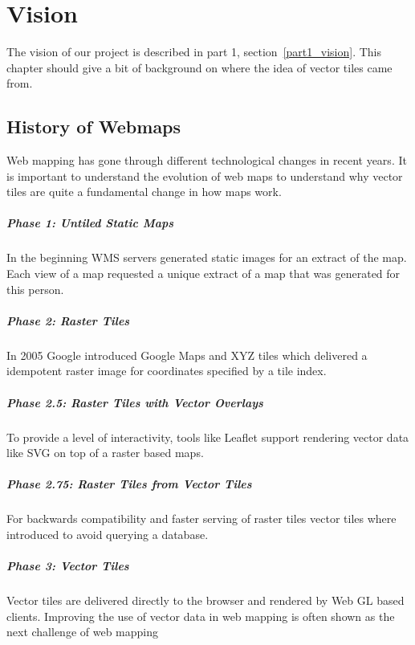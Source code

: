 \chapter{Vision}\label{vision}

The vision of our project is described in part 1, section~\ref{part1_vision}. This chapter should give a bit of background on where the idea of vector tiles came from.

\section{History of Webmaps}
\label{history-of-webmaps}

Web mapping has gone through different technological changes in recent years. It is important to understand the evolution of web maps to understand why vector tiles are quite a fundamental change in how maps work.

\paragraph{Phase 1: Untiled Static
Maps}

In the beginning WMS servers generated static images for an extract
of the map. Each view of a map requested a unique extract of a map that was generated for this person.

\paragraph{Phase 2: Raster Tiles}

In 2005 Google introduced Google Maps and XYZ 
tiles\cite{v_1_wiki.openstreetmap.org_2015}
which delivered a idempotent raster image for coordinates specified by a
tile index.

\paragraph{Phase 2.5: Raster Tiles with Vector
Overlays}

To provide a level of interactivity, tools like
Leaflet\cite{v_2_leafletjs.com_2015} support rendering vector
data like SVG on top of a raster based maps.

\paragraph{Phase 2.75: Raster Tiles from Vector
Tiles}

For backwards compatibility and faster serving of raster tiles vector
tiles where introduced to avoid querying a database.

\paragraph{Phase 3: Vector Tiles}

Vector tiles are delivered directly to the browser and rendered by Web
GL based clients.
\newline{}
Improving the use of vector data in web mapping is often shown as the next challenge
of web mapping \cite[p.~88]{gaffuri2012toward} 
